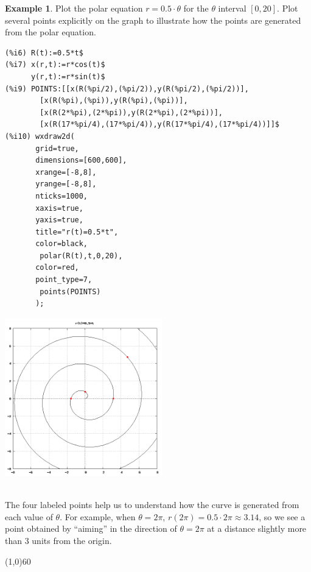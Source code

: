 \documentclass[10.5pt,twoside]{report}
\theoremstyle{definition}
\newtheorem{exmp}{Example}[section]
\begin{document}
\begin{exmp} Plot the polar equation $r=0.5\cdot \theta$ for the $\theta$ interval $[0,20]$.  Plot several points explicitly on the graph to illustrate how the points are generated from the polar equation.

\begin{verbatim}
(%i6) R(t):=0.5*t$
(%i7) x(r,t):=r*cos(t)$
      y(r,t):=r*sin(t)$
(%i9) POINTS:[[x(R(%pi/2),(%pi/2)),y(R(%pi/2),(%pi/2))],
        [x(R(%pi),(%pi)),y(R(%pi),(%pi))],
        [x(R(2*%pi),(2*%pi)),y(R(2*%pi),(2*%pi))],
        [x(R(17*%pi/4),(17*%pi/4)),y(R(17*%pi/4),(17*%pi/4))]]$
(%i10) wxdraw2d(
       grid=true,
       dimensions=[600,600],
       xrange=[-8,8],
       yrange=[-8,8],
       nticks=1000,
       xaxis=true,
       yaxis=true,
       title="r(t)=0.5*t",
       color=black,
        polar(R(t),t,0,20),
       color=red,
       point_type=7,
        points(POINTS)
       );
\end{verbatim}

\includegraphics[width=2.7in]{example_5_3_4_1}

${}$\\
The four labeled points help us to understand how the curve is generated from each value of $\theta$.  For example, when $\theta=2\pi$, $r(2\pi)=0.5\cdot 2\pi \approx 3.14$, so we see a point obtained by ``aiming'' in the direction of $\theta=2\pi$ at a distance slightly more than 3 units from the origin.

\end{exmp}

\line(1,0){60}
\linethickness{0.5mm}
\end{document}
